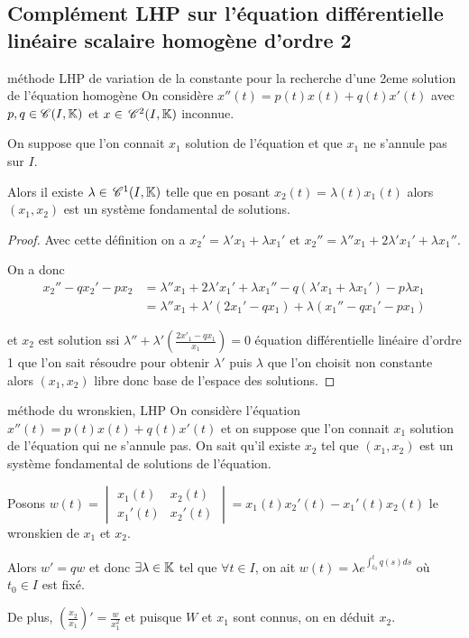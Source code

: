 \subsection{Complément LHP sur l'équation différentielle linéaire scalaire homogène d'ordre 2}

\begin{propositionnt}{méthode LHP de variation de la constante pour la recherche d'une 2eme solution de l'équation homogène}{}
    On considère $x''(t) = p(t) x(t) + q(t) x'(t)$ avec $p, q \in \mathscr C(I, \mathbb{K})$ et $x \in \,\mathscr C^{2}(I, \mathbb{K})$ inconnue.
    
    On suppose que l'on connait $x_1$ solution de l'équation et que $x_1$ ne s'annule pas sur $I$. 

    Alors il existe $\lambda \in \,\mathscr C^{1}(I, \mathbb{K})$ telle que en posant $x_2(t) = \lambda(t) x_1(t)$
    alors $(x_1, x_2)$ est un système fondamental de solutions. 
\end{propositionnt}

\begin{proof}
    Avec cette définition on a $x_2' = \lambda' x_1 + \lambda x_1'$ et 
    $x_2'' = \lambda'' x_1 + 2 \lambda' x_1' + \lambda x_1''$.

    On a donc 
    \begin{align}
        x_2'' - qx_2' - px_2 & = \lambda'' x_1 + 2 \lambda' x_1' + \lambda x_1'' - q (\lambda' x_1 + \lambda x_1') - p \lambda x_1 \\
        & = \lambda'' x_1 + \lambda'(2 x_1' - q x_1) + \lambda (x_1'' - q x_1' - p x_1) 
    \end{align}

    et $x_2$ est solution ssi $\lambda'' + \lambda' \left( \frac{2x'_1 - qx_1}{x_1} \right) = 0$
    équation différentielle linéaire d'ordre 1 que l'on sait résoudre pour obtenir $\lambda'$ puis 
    $\lambda$ que l'on choisit non constante alors $(x_1, x_2)$ libre donc base de l'espace des solutions. 
\end{proof}

\begin{proposition}{méthode du wronskien, LHP}{}
    On considère l'équation $x''(t) = p(t) x(t) + q(t) x'(t)$  et on suppose que 
    l'on connait $x_1$ solution de l'équation qui ne s'annule pas. On sait qu'il existe $x_2$
    tel que $(x_1, x_2)$ est un système fondamental de solutions de l'équation.

    Posons $w(t) = \begin{vmatrix}
    x_1(t) & x_2(t) \\
    x_1'(t) & x_2'(t)
    \end{vmatrix} = x_1(t) x_2'(t) - x_1'(t) x_2(t)$ le wronskien de $x_1$ et $x_2$.

    Alors $w' = q w$ et donc $\exists \lambda \in \mathbb{K}$ tel que $\forall t \in I$, 
    on ait $w(t) = \lambda e^{\int_{t_0}^t q(s) ds}$ où $t_0 \in I$ est fixé.

    De plus, $\left( \frac{x_2}{x_1} \right)' = \frac{w}{x_1^2}$ et puisque 
    $W$ et $x_1$ sont connus, on en déduit $x_2$. 
\end{proposition}